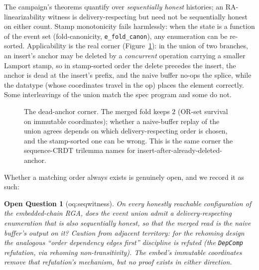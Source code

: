 \documentclass[11pt]{article}
\newcommand{\code}[1]{\texttt{#1}}
\newcommand{\del}{\mathsf{del}}
\newcommand{\ins}{\mathsf{ins}}
\newtheorem{oq}{Open Question}
\begin{document}
The campaign's theorems quantify over \emph{sequentially honest}
histories; an RA-linearizability witness is delivery-respecting but
need not be sequentially honest on either count. Stamp monotonicity
fails harmlessly: when the state is a function of the event set
(fold-canonicity, \code{e\_fold\_canon}), any enumeration can be
re-sorted. Applicability is the real corner
(Figure~\ref{fig:deadanchor}): in the union of two branches, an
insert's anchor may be deleted by a \emph{concurrent} operation
carrying a smaller Lamport stamp, so in stamp-sorted order the delete
precedes the insert, the anchor is dead at the insert's prefix, and
the naive buffer no-ops the splice, while the datatype (whose
coordinates travel in the op) places the element correctly. Some
interleavings of the union match the spec program and some do not.

\begin{figure}[h]
\centering
{}
\caption{The dead-anchor corner. The merged fold keeps $2$ (OR-set
survival on immutable coordinates); whether a naive-buffer replay of
the union agrees depends on which delivery-respecting order is chosen,
and the stamp-sorted one can be wrong. This is the same corner the
sequence-CRDT trilemma names for insert-after-already-deleted-anchor.}
\label{fig:deadanchor}
\end{figure}

Whether a matching order always exists is genuinely open, and we
record it as such:

\begin{oq}[oq:seqwitness]
On every honestly reachable configuration of the embedded-chain RGA,
does the event union admit a delivery-respecting enumeration that is
also sequentially honest, so that the merged read is the naive
buffer's output on it? Caution from adjacent territory: for the
rehoming design the analogous ``order dependency edges first''
discipline is refuted (the \code{DepComp} refutation, via rehoming
non-transitivity). The embed's immutable coordinates remove that
refutation's mechanism, but no proof exists in either direction.
\end{oq}
\end{document}
